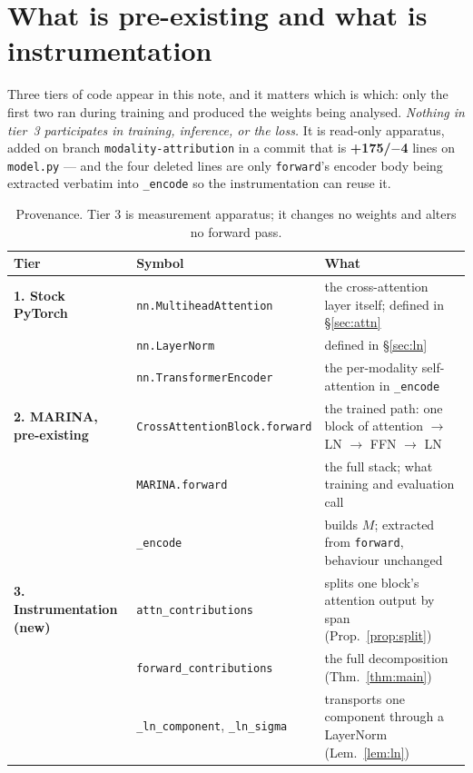 \documentclass[11pt]{article}
\theoremstyle{plain}
\theoremstyle{remark}
\newcommand{\code}[1]{\texttt{\small #1}}
\begin{document}
\section{What is pre-existing and what is instrumentation}
\label{sec:provenance}

Three tiers of code appear in this note, and it matters which is which: only
the first two ran during training and produced the weights being analysed.
\emph{Nothing in tier~3 participates in training, inference, or the loss.} It
is read-only apparatus, added on branch \code{modality-attribution} in a commit
that is \textbf{+175/$-$4} lines on \code{model.py} --- and the four deleted
lines are only \code{forward}'s encoder body being extracted verbatim into
\code{\_encode} so the instrumentation can reuse it.

\begin{table}[htbp]
\centering
\small
\caption{Provenance. Tier 3 is measurement apparatus; it changes no weights and
alters no forward pass.}
\label{tab:provenance}
\renewcommand{\arraystretch}{1.15}
\begin{tabular}{@{}l l p{5.3cm}@{}}
\toprule
Tier & Symbol & What \\
\midrule
\textbf{1. Stock PyTorch}
  & \code{nn.MultiheadAttention} & the cross-attention layer itself; defined in
    \S\ref{sec:attn} \\
  & \code{nn.LayerNorm} & defined in \S\ref{sec:ln} \\
  & \code{nn.TransformerEncoder} & the per-modality self-attention in
    \code{\_encode} \\
\addlinespace
\textbf{2. MARINA, pre-existing}
  & \code{CrossAttentionBlock.forward} & the trained path: one block of
    attention $\to$ LN $\to$ FFN $\to$ LN \\
  & \code{MARINA.forward} & the full stack; what training and evaluation call \\
  & \code{\_encode} & builds $M$; extracted from \code{forward}, behaviour
    unchanged \\
\addlinespace
\textbf{3. Instrumentation (new)}
  & \code{attn\_contributions} & splits one block's attention output by span
    (Prop.~\ref{prop:split}) \\
  & \code{forward\_contributions} & the full decomposition
    (Thm.~\ref{thm:main}) \\
  & \code{\_ln\_component}, \code{\_ln\_sigma} & transports one component
    through a LayerNorm (Lem.~\ref{lem:ln}) \\
\bottomrule
\end{tabular}
\end{table}
\end{document}
